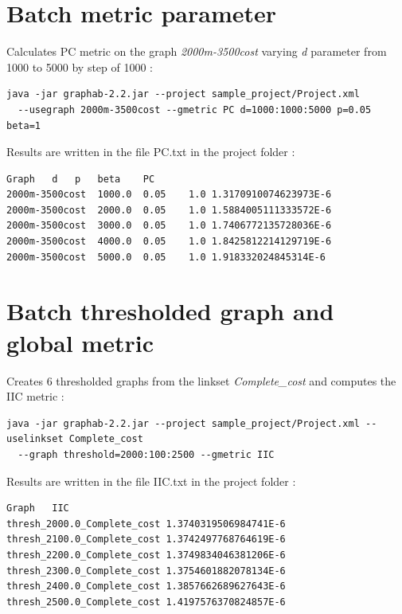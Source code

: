 \documentclass[a4paper,10pt]{report}
\begin{document}
\section{Batch metric parameter}
Calculates PC metric on the graph \textit{2000m-3500cost} varying \textit{d} parameter from 1000 to 5000 by step of 1000 :
\begin{Verbatim}
java -jar graphab-2.2.jar --project sample_project/Project.xml 
  --usegraph 2000m-3500cost --gmetric PC d=1000:1000:5000 p=0.05 beta=1
\end{Verbatim}
Results are written in the file PC.txt in the project folder :
\begin{Verbatim}
Graph	d	p	beta	PC
2000m-3500cost	1000.0	0.05	1.0	1.3170910074623973E-6
2000m-3500cost	2000.0	0.05	1.0	1.5884005111333572E-6
2000m-3500cost	3000.0	0.05	1.0	1.7406772135728036E-6
2000m-3500cost	4000.0	0.05	1.0	1.8425812214129719E-6
2000m-3500cost	5000.0	0.05	1.0	1.918332024845314E-6
\end{Verbatim}

\section{Batch thresholded graph and global metric}
Creates 6 thresholded graphs from the linkset \textit{Complete\_cost} and computes the IIC metric :
\begin{Verbatim}
java -jar graphab-2.2.jar --project sample_project/Project.xml --uselinkset Complete_cost
  --graph threshold=2000:100:2500 --gmetric IIC
\end{Verbatim}
Results are written in the file IIC.txt in the project folder :
\begin{Verbatim}
Graph	IIC
thresh_2000.0_Complete_cost	1.3740319506984741E-6
thresh_2100.0_Complete_cost	1.3742497768764619E-6
thresh_2200.0_Complete_cost	1.3749834046381206E-6
thresh_2300.0_Complete_cost	1.3754601882078134E-6
thresh_2400.0_Complete_cost	1.3857662689627643E-6
thresh_2500.0_Complete_cost	1.4197576370824857E-6
\end{Verbatim}
\end{document}
